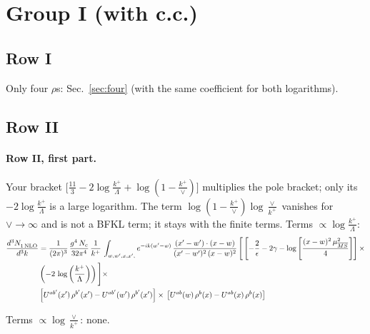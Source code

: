 \documentclass[10pt]{article}
\numberwithin{equation}{section}
\begin{document}
\section{Group I (with c.c.)}\label{sec:LLgI}
\subsection{Row I}
Only four $\rho$\textquotesingle s: Sec.~\ref{sec:four} (with the same coefficient for both logarithms).
\subsection{Row II}
\paragraph{Row II, first part.}
Your bracket $\big[\frac{11}{3}-2\log\frac{k^+}{\Lambda}+\log(1-\frac{k^+}{\vee})\big]$ multiplies the pole bracket; only its $-2\log\frac{k^+}{\Lambda}$ is a large logarithm. The term $\log(1-\frac{k^+}{\vee})\log\frac{\vee}{k^+}$ vanishes for $\vee\to\infty$ and is not a BFKL term; it stays with the finite terms.
\noindent Terms $\propto\log\frac{k^+}{\Lambda}$:
\begin{align}
     \frac{d^{3}N_{1\,\rm NLO}^{\rm}}{d^{3}k} &  =  \frac{1}{(2\pi)^{3}}\, \frac{g^{4}\,N_{c}}{32\pi^{4}}\,\frac{1}{k^{+}}\, \int_{w, w',x,x',} e^{-ik(w^\prime-w)}\, \frac{(x'-w')\cdot (x-w)}{(x'-w')^{2}\, (x-w)^{2}}\, \Bigg[\left[-\frac{2}{\epsilon}-2\gamma-\log{\left[\frac{(x-w)^{2}\,\mu^{2}_{\overline{MS}}}{4}\right]}\right]\times \notag \\ & \left(-2\,\log{\left(\frac{k^{+}}{\Lambda}\right)}\right)\Bigg]\times\notag \\ & \left[U^{ab'}(x')\,\rho^{b'}(x') - U^{ab'}(w')\,\rho^{b'}(x')\right]\times\,\left[U^{ab}(w)\,\rho^{b}(x) - U^{ab}(x)\,\rho^{b}(x)\right] \label{eq:J:G1II1}
\end{align}

\noindent Terms $\propto\log\frac{\vee}{k^+}$: none.
\end{document}

